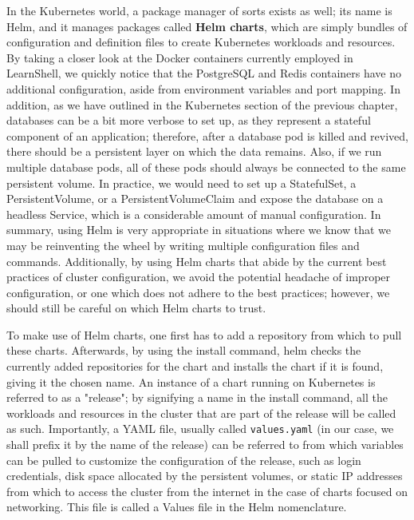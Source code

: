 \documentclass[thesis=B,english]{FITthesis}[2019/12/23]
\begin{document}
In the Kubernetes world, a package manager of sorts exists as well; its name is Helm, and it manages packages called \textbf{Helm charts}, which are simply bundles of configuration and definition files to create Kubernetes workloads and resources. By taking a closer look at the Docker containers currently employed in LearnShell, we quickly notice that the PostgreSQL and Redis containers have no additional configuration, aside from environment variables and port mapping. In addition, as we have outlined in the Kubernetes section of the previous chapter, databases can be a bit more verbose to set up, as they represent a stateful component of an application; therefore, after a database pod is killed and revived, there should be a persistent layer on which the data remains. Also, if we run multiple database pods, all of these pods should always be connected to the same persistent volume. In practice, we would need to set up a StatefulSet, a PersistentVolume, or a PersistentVolumeClaim and expose the database on a headless Service, which is a considerable amount of manual configuration.
In summary, using Helm is very appropriate in situations where we know that we may be reinventing the wheel by writing multiple configuration files and commands. Additionally, by using Helm charts that abide by the current best practices of cluster configuration, we avoid the potential headache of improper configuration, or one which does not adhere to the best practices; however, we should still be careful on which Helm charts to trust.

To make use of Helm charts, one first has to add a repository from which to pull these charts. Afterwards, by using the install command, helm checks the currently added repositories for the chart and installs the chart if it is found, giving it the chosen name. An instance of a chart running on Kubernetes is referred to as a "release"; by signifying a name in the install command, all the workloads and resources in the cluster that are part of the release will be called as such. Importantly, a YAML file, usually called \verb|values.yaml| (in our case, we shall prefix it by the name of the release) can be referred to from which variables can be pulled to customize the configuration of the release, such as login credentials, disk space allocated by the persistent volumes, or static IP addresses from which to access the cluster from the internet in the case of charts focused on networking. This file is called a Values file in the Helm nomenclature. \cite{using-helm}
\end{document}
